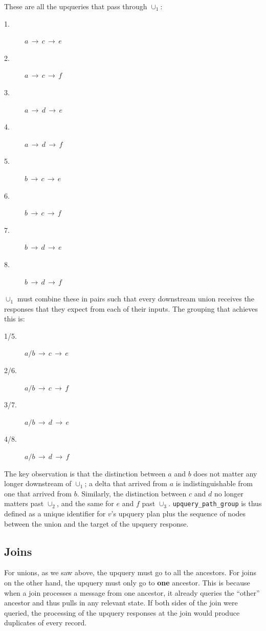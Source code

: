 These are all the upqueries that pass through $\cup_1$:
        
\begin{multicols}{4}
\begin{description}
  \item [1.] $a\,\to\,c\,\to\,e$
  \item [2.] $a\,\to\,c\,\to\,f$
  \item [3.] $a\,\to\,d\,\to\,e$
  \item [4.] $a\,\to\,d\,\to\,f$
  \item [5.] $b\,\to\,c\,\to\,e$
  \item [6.] $b\,\to\,c\,\to\,f$
  \item [7.] $b\,\to\,d\,\to\,e$
  \item [8.] $b\,\to\,d\,\to\,f$
\end{description}
\end{multicols}

$\cup_1$ must combine these in pairs such that every downstream union receives
the responses that they expect from each of their inputs. The grouping that
achieves this is:

\begin{multicols}{2}
\begin{description}
  \item [1/5.] $a/b\,\to\,c\,\to\,e$
  \item [2/6.] $a/b\,\to\,c\,\to\,f$
  \item [3/7.] $a/b\,\to\,d\,\to\,e$
  \item [4/8.] $a/b\,\to\,d\,\to\,f$
\end{description}
\end{multicols}

The key observation is that the distinction between $a$ and $b$ does not matter
any longer downstream of $\cup_1$; a delta that arrived from $a$ is
indistinguishable from one that arrived from $b$. Similarly, the distinction
between $c$ and $d$ no longer matters past $\cup_2$, and the same for $e$ and
$f$ past $\cup_3$. \texttt{upquery\_path\_group} is thus defined as a unique
identifier for $v$'s upquery plan plus the sequence of nodes between the union
and the target of the upquery response.

\subsection{Joins}

For unions, as we saw above, the upquery must go to all the ancestors. For joins
on the other hand, the upquery must only go to \textbf{one} ancestor. This is
because when a join processes a message from one ancestor, it already queries
the ``other'' ancestor and thus pulls in any relevant state. If both sides of
the join were queried, the processing of the upquery responses at the join would
produce duplicates of every record.

